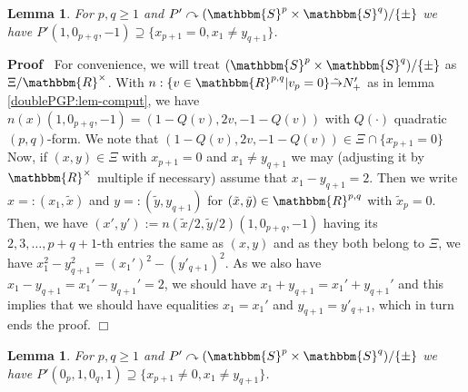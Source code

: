 \documentclass{article}
\newcommand{\assign}{:=}
\renewenvironment{proof}{\noindent\textbf{Proof\ }}{\hspace*{\fill}$\Box$\medskip}
\newtheorem{lemma}[proposition]{Lemma}
\theoremstyle{remark}
\begin{document}
\begin{lemma}
  \label{doublePGP:lem-ne}For $p, q \geqslant 1$ and $P' \curvearrowright
  (\mathbbm{S}^p \times \mathbbm{S}^q) / \{ \pm \}$ we have $P' (1, 0_{p + q},
  - 1) \supseteq \{ x_{p + 1} = 0, x_1 \neq y_{q + 1} \}$.
\end{lemma}

\begin{proof}
  For convenience, we will treat $(\mathbbm{S}^p \times \mathbbm{S}^q) / \{
  \pm \}$ as $\Xi /\mathbbm{R}^{\times}$. With $n : \{ v \in \mathbbm{R}^{p,
  q} | v_p = 0 \} \tilde{\rightarrow} N_+'$ as in lemma
  \ref{doublePGP:lem-comput}, we have $n (x) (1, 0_{p + q}, - 1) = (1 - Q (v),
  2 v, - 1 - Q (v))$ with $Q (\cdot)$ quadratic $(p, q)$-form. We note that
  $(1 - Q (v), 2 v, - 1 - Q (v)) \in \Xi^{} \cap \{ x_{p + 1} = 0 \}$ Now, if
  $(x, y) \in \Xi$ with $x_{p + 1} = 0$ and $x_1 \neq y_{q + 1}$ we may
  (adjusting it by $\mathbbm{R}^{\times}$ multiple if necessary) assume that
  $x_1 - y_{q + 1} = 2$. Then we write $x = : (x_1, \tilde{x})$ and $y = :
  (\tilde{y}, y_{q + 1})$ for $(\tilde{x}, \tilde{y}) \in \mathbbm{R}^{p, q}$
  with $\widetilde{x}_p = 0$. Then, we have $(x', y') \assign n (\tilde{x}
  / 2, \tilde{y} / 2) (1, 0_{p + q}, - 1)$ having its $2, 3, \ldots, p + q +
  1$-th entries the same as $(x, y)$ and as they both belong to $\Xi$, we have
  $x_1^2 - y_{q + 1}^2 = (x_1')^2 - (y'_{q + 1})^2$. As we also have $x_1 -
  y_{q + 1} = x_1' - y_{q + 1}' = 2$, we should have $x_1 + y_{q + 1} = x_1' +
  y_{q + 1}'$ and this implies that we should have equalities $x_1 = x_1'$ and
  $y_{q + 1} = y'_{q + 1}$, which in turn ends the proof.
\end{proof}

\begin{lemma}
  \label{doublePGP:lem-nn}\label{doublePGP:lem-nn}For $p, q \geqslant 1$ and
  $P' \curvearrowright (\mathbbm{S}^p \times \mathbbm{S}^q) / \{ \pm \}$ we
  have $P' (0_p, 1, 0_q, 1) \supseteq \{ x_{p + 1} \neq 0, x_1 \neq y_{q + 1}
  \}$.
\end{lemma}
\end{document}
